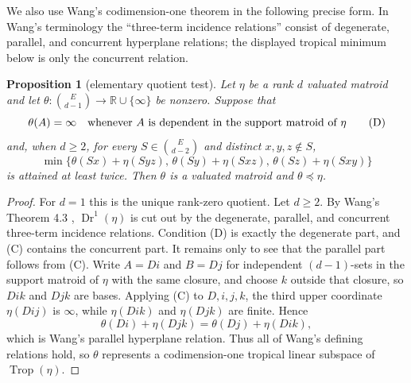 \documentclass[12pt]{article}
\newcommand{\Dr}{\operatorname{Dr}}
\newcommand{\Trop}{\operatorname{Trop}}
\newtheorem{proposition}{Proposition}
\begin{document}
We also use Wang's codimension-one theorem in the following precise
form.  In Wang's terminology the ``three-term incidence relations''
consist of degenerate, parallel, and concurrent hyperplane relations;
the displayed tropical minimum below is only the concurrent relation.

\begin{proposition}[elementary quotient test]\label{prop:elementarytest}
Let $\eta$ be a rank $d$ valuated matroid and let
$\theta:\binom{E}{d-1}\to{\mathbb R}\cup\{\infty\}$ be nonzero.  Suppose
that
\[
        \theta(A)=\infty\quad\hbox{whenever }A
        \hbox{ is dependent in the support matroid of }\eta              \tag{D}
\]
and, when $d\ge2$, for every $S\in\binom{E}{d-2}$ and distinct $x,y,z\notin S$,
\[
\min\{\theta(Sx)+\eta(Syz),\,
      \theta(Sy)+\eta(Sxz),\,
      \theta(Sz)+\eta(Sxy)\}                                      \tag{C}
\]
is attained at least twice.  Then $\theta$ is a valuated matroid and
$\theta\preceq\eta$.
\end{proposition}

\begin{proof}
For $d=1$ this is the unique rank-zero quotient.  Let $d\ge2$.  By
Wang's Theorem 4.3 \cite{Wang}, $\Dr^1(\eta)$ is cut out by the
degenerate, parallel, and concurrent three-term incidence relations.
Condition (D) is exactly the degenerate part, and (C) contains the
concurrent part.  It remains only to see that the parallel part follows
from (C).  Write $A=Di$ and $B=Dj$ for independent $(d-1)$-sets in the
support matroid of $\eta$ with the same closure, and choose $k$ outside
that closure, so $Dik$ and $Djk$ are bases.  Applying (C) to
$D,i,j,k$, the third upper coordinate $\eta(Dij)$ is $\infty$, while
$\eta(Dik)$ and $\eta(Djk)$ are finite.  Hence
\[
        \theta(Di)+\eta(Djk)=\theta(Dj)+\eta(Dik),
\]
which is Wang's parallel hyperplane relation.  Thus all of Wang's
defining relations hold, so $\theta$ represents a codimension-one
tropical linear subspace of $\Trop(\eta)$.
\end{proof}
\end{document}
